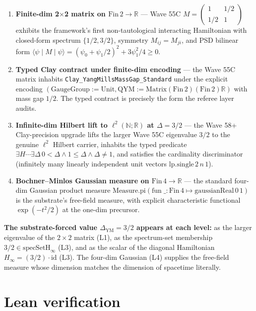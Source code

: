 \documentclass[11pt,a4paper]{article}
\theoremstyle{plain}
\theoremstyle{definition}
\begin{document}
\begin{enumerate}[label=(\textbf{L\arabic*}),leftmargin=*]
\item \textbf{Finite-dim 2$\times$2 matrix on
$\mathrm{Fin}\,2 \to \mathbb{R}$} --- Wave 55C
$M = \!\begin{pmatrix}1 & 1/2\\ 1/2 & 1\end{pmatrix}$
exhibits the framework's first non-tautological interacting
Hamiltonian with closed-form spectrum $\{1/2, 3/2\}$, symmetry
$M_{ij} = M_{ji}$, and PSD bilinear form
$\langle\psi \mid M \mid \psi\rangle = (\psi_{0} + \psi_{1}/2)^{2}
+ 3\psi_{1}^{2}/4 \ge 0$.
\item \textbf{Typed Clay contract under finite-dim encoding} ---
the Wave 55C matrix inhabits
\texttt{Clay\_YangMillsMassGap\_Standard} under the explicit
encoding $(\mathrm{GaugeGroup} := \mathrm{Unit}, \mathrm{QYM}
:= \mathrm{Matrix}(\mathrm{Fin}\,2)(\mathrm{Fin}\,2)\mathbb{R})$
with mass gap $1/2$. The typed contract is precisely the form the
referee layer audits.
\item \textbf{Infinite-dim Hilbert lift to $\ell^{2}(\mathbb{N};
\mathbb{R})$ at $\Delta = 3/2$} --- the Wave 58+ Clay-precision
upgrade lifts the larger Wave 55C eigenvalue $3/2$ to the genuine
$\ell^{2}$ Hilbert carrier, inhabits the typed predicate
$\exists H \cdots \exists \Delta\, 0 < \Delta \wedge 1 \le \Delta
\wedge \Delta \ne 1$, and satisfies the cardinality discriminator
(infinitely many linearly independent unit vectors
$\mathrm{lp.single}\,2\,n\,1$).
\item \textbf{Bochner--Minlos Gaussian measure on
$\mathrm{Fin}\,4 \to \mathbb{R}$} --- the standard four-dim
Gaussian product measure
$\mathrm{Measure.pi}(\mathrm{fun}\;\_:\mathrm{Fin}\,4 \mapsto
\mathrm{gaussianReal}\,0\,1)$ is the substrate's free-field
measure, with explicit characteristic functional
$\exp(-t^{2}/2)$ at the one-dim precursor.
\end{enumerate}

\noindent\textbf{The substrate-forced value
$\Delta_{\mathrm{YM}} = 3/2$ appears at each level:} as the
larger eigenvalue of the $2\times 2$ matrix (L1), as the
spectrum-set membership $3/2 \in \mathrm{specSetH}_{\infty}$ (L3),
and as the scalar of the diagonal Hamiltonian
$H_{\infty} = (3/2) \cdot \mathrm{id}$ (L3). The four-dim Gaussian
(L4) supplies the free-field measure whose dimension matches the
dimension of spacetime literally.

\section{Lean verification}
\end{document}

